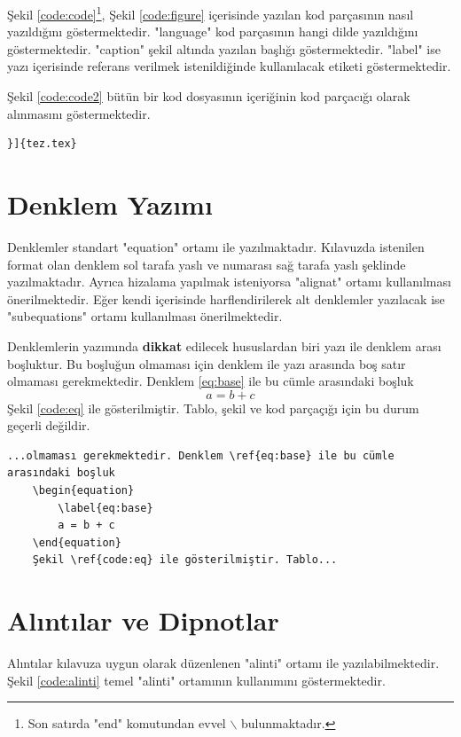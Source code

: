 Şekil \ref{code:code}\footnote{Son satırda "end" komutundan evvel $\backslash$ bulunmaktadır.}, Şekil \ref{code:figure} içerisinde yazılan kod parçasının nasıl yazıldığını göstermektedir. "language" kod parçasının hangi dilde yazıldığını göstermektedir. "caption" şekil altında yazılan başlığı göstermektedir. "label" ise yazı içerisinde referans verilmek istenildiğinde kullanılacak etiketi göstermektedir.

Şekil \ref{code:code2} bütün bir kod dosyasının içeriğinin kod parçacığı olarak alınmasını göstermektedir.
\begin{lstlisting}[language={[LaTeX]{TeX}}, label=code:code2, caption=tez.tex dosyasının içeriğinin yazılması]
}]{tez.tex}
\end{lstlisting}

\chapter{Denklem Yazımı}
Denklemler standart "equation" ortamı ile yazılmaktadır. Kılavuzda istenilen format olan denklem sol tarafa yaslı ve numarası sağ tarafa yaslı şeklinde yazılmaktadır. Ayrıca hizalama yapılmak isteniyorsa "alignat" ortamı kullanılması önerilmektedir. Eğer kendi içerisinde harflendirilerek alt denklemler yazılacak ise "subequations" ortamı kullanılması önerilmektedir. 

Denklemlerin yazımında \textbf{dikkat}  edilecek hususlardan biri yazı ile denklem arası boşluktur. Bu boşluğun olmaması için denklem ile yazı arasında boş satır olmaması gerekmektedir. Denklem \ref{eq:base} ile bu cümle arasındaki boşluk
\begin{equation}
	\label{eq:base}
	a = b + c
\end{equation}
Şekil \ref{code:eq} ile gösterilmiştir. Tablo, şekil ve kod parçaçığı için bu durum geçerli değildir.

\begin{lstlisting}[language={[LaTeX]{TeX}}, label=code:eq, caption=Örnek denklem yazımı]
	...olmaması gerekmektedir. Denklem \ref{eq:base} ile bu cümle arasındaki boşluk
	\begin{equation}
		\label{eq:base}
		a = b + c
	\end{equation}
	Şekil \ref{code:eq} ile gösterilmiştir. Tablo...
\end{lstlisting}


\chapter{Alıntılar ve Dipnotlar}
Alıntılar kılavuza uygun olarak düzenlenen "alinti" ortamı ile yazılabilmektedir. Şekil \ref{code:alinti} temel "alinti" ortamının kullanımını göstermektedir.

